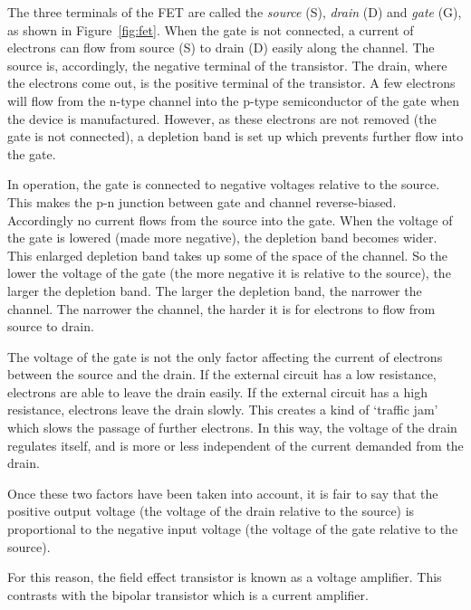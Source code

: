 The three terminals of the FET are called the \textit{source} (S), \textit{drain} (D) and \textit{gate} (G), as shown in Figure~\ref{fig:fet}.  When the gate is not connected, a current of electrons can flow from source (S) to drain (D) easily along the channel.  The source is, accordingly, the negative terminal of the transistor.  The drain, where the electrons come out, is the positive terminal of the transistor.  A few electrons will flow from the n-type channel into the p-type semiconductor of the gate when the device is manufactured.  However, as these electrons are not removed (the gate is not connected), a depletion band is set up which prevents further flow into the gate.

In operation, the gate is connected to negative voltages relative to the source.  This makes the p-n junction between gate and channel reverse-biased.  Accordingly no current flows from the source into the gate.  When the voltage of the gate is lowered (made more negative), the depletion band becomes wider.  This enlarged depletion band takes up some of the space of the channel.  So the lower the voltage of the gate (the more negative it is relative to the source), the larger the depletion band.  The larger the depletion band, the narrower the channel.  The narrower the channel, the harder it is for electrons to flow from source to drain.

The voltage of the gate is not the only factor affecting the current of electrons between the source and the drain.  If the external circuit has a low resistance, electrons are able to leave the drain easily.  If the external circuit has a high resistance, electrons leave the drain slowly.  This creates a kind of `traffic jam' which slows the passage of further electrons.  In this way, the voltage of the drain regulates itself, and is more or less independent of the current demanded from the drain.

Once these two factors have been taken into account, it is fair to say that the positive output voltage (the voltage of the drain relative to the source) is proportional to the negative input voltage (the voltage of the gate relative to the source).

For this reason, the field effect transistor is known as a voltage amplifier.  This contrasts with the bipolar transistor which is a current amplifier.

